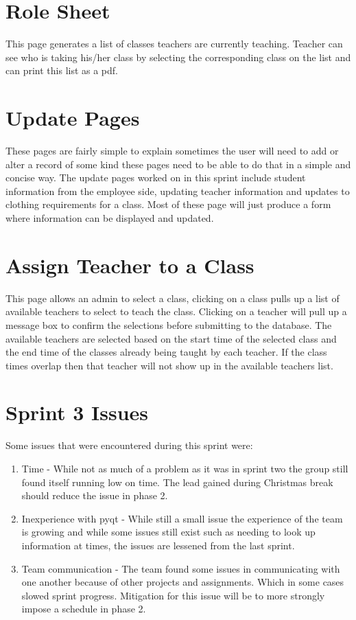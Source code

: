 \documentclass[11pt]{book}
\begin{document}
\section{Role Sheet}
This page generates a list of classes teachers are currently teaching. Teacher can see who is taking his/her class by selecting the corresponding class on the list and can print this list as a pdf. 

\section{Update Pages}
These pages are fairly simple to explain sometimes the user will need to add or alter a record of some kind these pages need to be able to do that in a simple and concise way. The update pages worked on in this sprint include student information from the employee side, updating teacher information and updates to clothing requirements for a class. Most of these page will just produce a form where information can be displayed and updated.

\section{Assign Teacher to a Class}
This page allows an admin to select a class, clicking on a class pulls up a list of available teachers to select to teach the class. Clicking on a teacher will pull up a message box to confirm the selections before submitting to the database. The available teachers are selected based on the start time of the selected class and the end time of the classes already being taught by each teacher. If the class times overlap then that teacher will not show up in the available teachers list.

\section{Sprint 3 Issues}
Some issues that were encountered during this sprint were:

\begin{enumerate}
\item Time - While not as much of a problem as it was in sprint two the group still found itself running low on time. The lead gained during Christmas break should reduce the issue in phase 2.
\item Inexperience with pyqt - While still a small issue the experience of the team is growing and while some issues still exist such as needing to look up information at times, the issues are lessened from the last sprint.
\item Team communication - The team found some issues in communicating with one another because of other projects and assignments. Which in some cases slowed sprint progress. Mitigation for this issue will be to more strongly impose a schedule in phase 2.
\end{enumerate}
\end{document}
